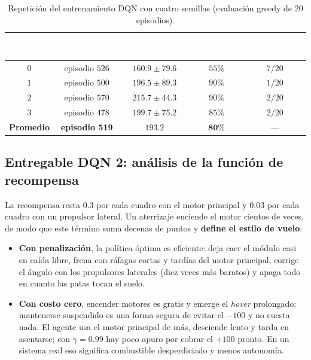\documentclass[11pt]{article}
\begin{document}
\begin{table}[H]
\centering
\renewcommand{\arraystretch}{1.2}
\begin{tabular}{|c|c|c|c|c|}
\hline
\rowcolor{iberoblue}
\textcolor{white}{Semilla} & \textcolor{white}{Paro (media $\ge 200$)} &
\textcolor{white}{Greedy, media $\pm$ $\sigma$} & \textcolor{white}{Aterrizajes} &
\textcolor{white}{Se queda flotando} \\ \hline
$0$ & episodio $526$ & $160.9 \pm 79.6$ & $55\%$ & $7/20$ \\ \hline
$1$ & episodio $500$ & $196.5 \pm 89.3$ & $90\%$ & $1/20$ \\ \hline
$2$ & episodio $570$ & $215.7 \pm 44.3$ & $90\%$ & $2/20$ \\ \hline
$3$ & episodio $478$ & $199.7 \pm 75.2$ & $85\%$ & $2/20$ \\ \hline
\textbf{Promedio} & \textbf{episodio 519} & $\mathbf{193.2}$ & $\mathbf{80\%}$ & --- \\ \hline
\end{tabular}
\caption{Repetición del entrenamiento DQN con cuatro semillas (evaluación greedy
de 20 episodios).}
\label{tbl:semillas}
\end{table}

\subsection{Entregable DQN 2: análisis de la función de recompensa}

La recompensa resta $0.3$ por cada cuadro con el motor principal y $0.03$ por cada
cuadro con un propulsor lateral. Un aterrizaje enciende el motor cientos de
veces, de modo que este término suma decenas de puntos y \textbf{define el estilo
de vuelo}:
\begin{itemize}
    \item \textbf{Con penalización}, la política óptima es eficiente: deja caer el
    módulo casi en caída libre, frena con ráfagas cortas y tardías del motor
    principal, corrige el ángulo con los propulsores laterales (diez veces más
    baratos) y apaga todo en cuanto las patas tocan el suelo.
    \item \textbf{Con costo cero}, encender motores es gratis y emerge el
    \emph{hover} prolongado: mantenerse suspendido es una forma segura de evitar el
    $-100$ y no cuesta nada. El agente usa el motor principal de más, desciende
    lento y tarda en asentarse; con $\gamma = 0.99$ hay poco apuro por cobrar el
    $+100$ pronto. En un sistema real eso significa combustible desperdiciado y
    menos autonomía.
\end{itemize}
\end{document}
